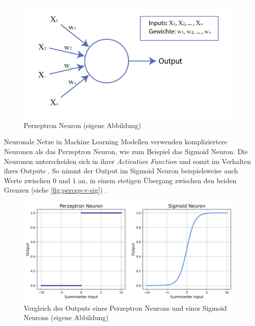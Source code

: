 \begin{figure}[!ht]
    \centering
    \includegraphics[width=\textwidth]{images/theorie/neuron.png}
    \caption{Perzeptron Neuron (eigene Abbildung)}
    \label{fig:neuron}
\end{figure}

Neuronale Netze in Machine Learning Modellen verwenden kompliziertere Neuronen
als das Perzeptron Neuron, wie zum Beispiel das Sigmoid Neuron. Die Neuronen
unterscheiden sich in ihrer \emph{Activation Function} und somit im Verhalten ihres
Outputs \cite{pragati_baheti_activation_2022}. So nimmt der Output im Sigmoid Neuron
beispielsweise auch Werte zwischen $0$ und $1$ an, in einem stetigen Übergang
zwischen den beiden Grenzen (siehe \autoref{fig:percep-v-sig}) \cite{kumar_sigmoid_2019}.

\begin{figure}[!ht]
    \centering
    \includegraphics[width=\textwidth]{images/theorie/percep-v-sig.png}
    \caption{Vergleich des Outputs eines Perzeptron Neurons und eines Sigmoid Neurons (eigene Abbildung)}
    \label{fig:percep-v-sig}
\end{figure}

